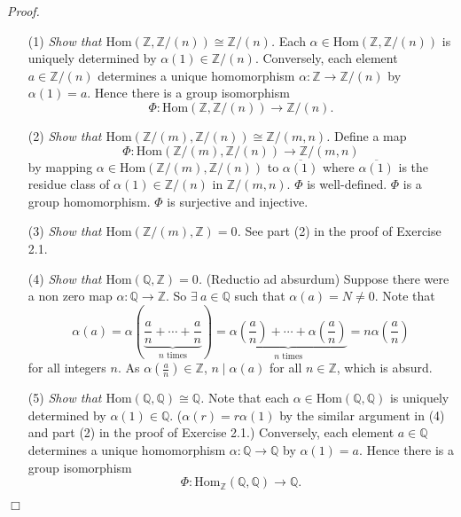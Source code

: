 \documentclass{article}
\begin{document}
\emph{Proof.}
\begin{enumerate}
\item[(1)]
  \emph{Show that $\mathrm{Hom}(\mathbb{Z},\mathbb{Z}/(n)) \cong \mathbb{Z}/(n)$.}
  Each $\alpha \in \mathrm{Hom}(\mathbb{Z},\mathbb{Z}/(n))$
  is uniquely determined by $\alpha(1) \in \mathbb{Z}/(n)$.
  Conversely, each element $a \in \mathbb{Z}/(n)$ determines
  a unique homomorphism $\alpha: \mathbb{Z} \to \mathbb{Z}/(n)$ by $\alpha(1) = a$.
  Hence there is a group isomorphism
  \[
    \Phi: \mathrm{Hom}(\mathbb{Z},\mathbb{Z}/(n)) \to \mathbb{Z}/(n).
  \]

\item[(2)]
  \emph{Show that $\mathrm{Hom}(\mathbb{Z}/(m),\mathbb{Z}/(n)) \cong \mathbb{Z}/(m,n)$.}
  Define a map
  \[
    \Phi: \mathrm{Hom}(\mathbb{Z}/(m),\mathbb{Z}/(n)) \to \mathbb{Z}/(m,n)
  \]
  by mapping $\alpha \in \mathrm{Hom}(\mathbb{Z}/(m),\mathbb{Z}/(n))$ to $\overline{\alpha(1)}$
  where $\overline{\alpha(1)}$ is the residue class of $\alpha(1) \in \mathbb{Z}/(n)$
  in $\mathbb{Z}/(m,n)$.
  $\Phi$ is well-defined.
  $\Phi$ is a group homomorphism.
  $\Phi$ is surjective and injective.

\item[(3)]
  \emph{Show that $\mathrm{Hom}(\mathbb{Z}/(m),\mathbb{Z}) = 0$.}
  See part (2) in the proof of Exercise 2.1.

\item[(4)]
  \emph{Show that $\mathrm{Hom}(\mathbb{Q},\mathbb{Z}) = 0$.}
  (Reductio ad absurdum)
  Suppose there were a non zero map $\alpha: \mathbb{Q} \to \mathbb{Z}$.
  So $\exists \: a \in \mathbb{Q}$ such that $\alpha(a) = N \neq 0$.
  Note that
  \[
    \alpha(a)
    = \alpha\left(\underbrace{\frac{a}{n} + \cdots + \frac{a}{n}}_{\text{$n$ times}} \right)
    = \underbrace{\alpha\left( \frac{a}{n} \right) + \cdots + \alpha\left( \frac{a}{n} \right)}_{
        \text{$n$ times}}
    = n \alpha\left( \frac{a}{n} \right)
  \]
  for all integers $n$.
  As $\alpha\left( \frac{a}{n} \right) \in \mathbb{Z}$,
  $n \mid \alpha(a)$ for all $n \in \mathbb{Z}$, which is absurd.

\item[(5)]
  \emph{Show that $\mathrm{Hom}(\mathbb{Q},\mathbb{Q}) \cong \mathbb{Q}$.}
  Note that each $\alpha \in \mathrm{Hom}(\mathbb{Q},\mathbb{Q})$
  is uniquely determined by $\alpha(1) \in \mathbb{Q}$.
  ($\alpha(r) = r\alpha(1)$ by the similar argument in (4) and part (2) in the proof of Exercise 2.1.)
  Conversely, each element $a \in \mathbb{Q}$ determines
  a unique homomorphism $\alpha: \mathbb{Q} \to \mathbb{Q}$ by $\alpha(1) = a$.
  Hence there is a group isomorphism
  \[
    \Phi: \mathrm{Hom}_{\mathbb{Z}}(\mathbb{Q},\mathbb{Q}) \to \mathbb{Q}.
  \]
\end{enumerate}
$\Box$ \\\\
\end{document}
